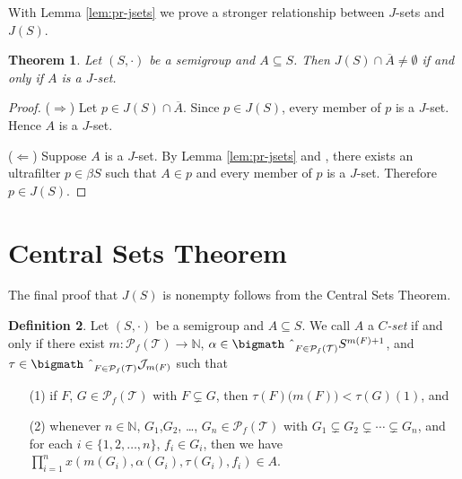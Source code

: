 \documentclass[12pt,showtrims]{memoir}
\theoremstyle{plain}
\newtheorem{thm}{Theorem}[section]
\theoremstyle{definition}
\newtheorem{defn}[thm]{Definition}
\newcommand{\bbN}{\mathbb{N}}
\newcommand{\calJ}{\mathcal{J}}
\newcommand{\calT}{\mathcal{T}}
\newcommand{\Pf}{\mathcal{P}_f}
\newcommand{\bigtimes}{\hbox{\bigmath \char'2}}
\begin{document}
With Lemma \ref{lem:pr-jsets} we prove a stronger relationship between $J$-sets and $J(S)$.

\begin{thm}
  \label{thm:jsets-ideal}
  Let $(S, \cdot)$ be a semigroup and $A \subseteq S$.
  Then $J(S) \cap \overline{A} \ne \emptyset$ if and only if $A$ is a $J$-set.
\end{thm}
\begin{proof}
  ($\Rightarrow$)
  Let $p \in J(S) \cap \overline{A}$. 
  Since $p \in J(S)$, every member of $p$ is a $J$-set.
  Hence $A$ is a $J$-set.

  ($\Leftarrow$)
  Suppose $A$ is a $J$-set. 
  By Lemma \ref{lem:pr-jsets} and \cite[Theorem 3.11]{Hindman:1998fk}, there exists an ultrafilter $p \in \beta S$ such that $A \in p$ and every member of $p$ is a $J$-set. 
  Therefore $p \in J(S)$.
\end{proof}


\section{Central Sets Theorem}
The final proof that $J(S)$ is nonempty follows from the Central Sets Theorem.
\begin{defn}
  Let $(S, \cdot)$ be a semigroup and $A \subseteq S$.
  We call $A$ a \textsl{$C$-set} if and only if there exist $m \colon \Pf(\calT) \to \bbN$, $\alpha \in \bigtimes_{F \in \Pf(\calT)} S^{m(F)+1}$, and $\tau \in \bigtimes_{F \in \Pf(\calT)} \calJ_{m(F)}$ such that 
  \begin{itemize}
    \item[(1)] if $F$, $G \in \Pf(\calT)$ with $F \subsetneq G$, then $\tau(F)\bigl( m(F) \bigr) < \tau(G)(1)$, and
    \item[(2)] whenever $n \in \bbN$, $G_1$,$G_2$, \dots, $G_n \in \Pf(\calT)$  with $G_1 \subsetneq G_2 \subsetneq \cdots \subsetneq G_n$, and for each $i \in \{1, 2, \ldots, n\}$, $f_i \in G_i$, then we have $\prod_{i=1}^n x(m(G_i), \alpha(G_i), \tau(G_i), f_i) \in A$.
  \end{itemize}
\end{defn}
\end{document}
